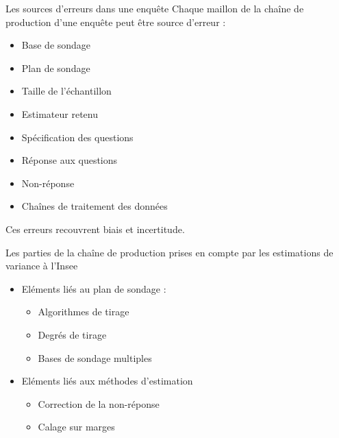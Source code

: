 \documentclass[xcolor=dvipsnames]{beamer}
\begin{document}
\begin{frame}{Les sources d'erreurs dans une enquête}
Chaque maillon de la chaîne de production d'une enquête peut être source d'erreur :

\begin{itemize}
    \item Base de sondage
    \item Plan de sondage
    \item Taille de l'échantillon
    \item Estimateur retenu
    \item Spécification des questions
    \item Réponse aux questions
    \item Non-réponse
    \item Chaînes de traitement des données
\end{itemize}

Ces erreurs recouvrent biais et incertitude.

\end{frame}

\begin{frame}{Les parties de la chaîne de production prises en compte par les estimations de variance à l'Insee}
    
\begin{itemize}
    \item Eléments liés au plan de sondage :
    \begin{itemize}
        \vspace{0.2 cm}
        \item Algorithmes de tirage
        \vspace{0.2 cm}
        \item Degrés de tirage
        \vspace{0.2 cm}
        \item Bases de sondage multiples
    \end{itemize}
    \vspace{0.5 cm}
    \item Eléments liés aux méthodes d'estimation
    \begin{itemize}
        \vspace{0.2 cm}
        \item Correction de la non-réponse
        \vspace{0.2 cm}
        \item Calage sur marges
    \end{itemize}
\end{itemize}
    
\end{frame}
\end{document}
